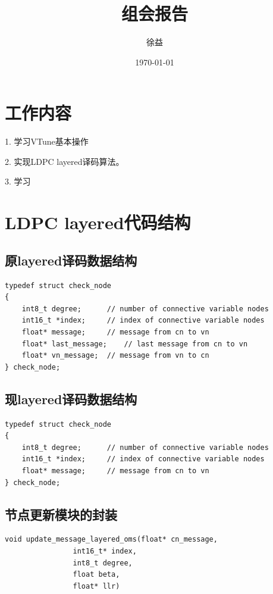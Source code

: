 \documentclass{article}
\title{组会报告}
\author{徐益}
\date{\today}
\begin{document}
\maketitle


\section{工作内容}
1. 学习VTune基本操作

2. 实现LDPC layered译码算法。

3. 学习

\section{LDPC layered代码结构}
\subsection{原layered译码数据结构}
\lstset{language=C++}
\begin{lstlisting}
typedef struct check_node
{
	int8_t degree;		// number of connective variable nodes
	int16_t *index;		// index of connective variable nodes
	float* message;		// message from cn to vn
	float* last_message;	// last message from cn to vn
	float* vn_message;	// message from vn to cn
} check_node;
\end{lstlisting}
\subsection{现layered译码数据结构}
\lstset{language=C++}
\begin{lstlisting}
typedef struct check_node
{
	int8_t degree;		// number of connective variable nodes
	int16_t *index;		// index of connective variable nodes
	float* message;		// message from cn to vn
} check_node;
\end{lstlisting}
\subsection{节点更新模块的封装}
\lstset{language=C++}
\begin{lstlisting}
void update_message_layered_oms(float* cn_message, 
				int16_t* index, 
				int8_t degree, 
				float beta, 
				float* llr)

\end{lstlisting}
\end{document}
